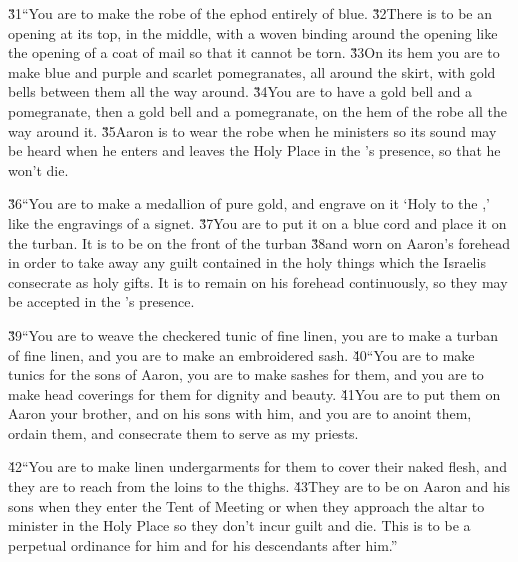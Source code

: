 \v{31}``You are to make the robe of the ephod entirely of blue. \v{32}There is to be an opening at its top, in the middle, with a woven binding around the opening like the opening of a coat of mail so that it cannot be torn. \v{33}On its hem you are to make blue and purple and scarlet pomegranates, all around the skirt, with gold bells between them all the way around. \v{34}You are to have a gold bell and a pomegranate, then a gold bell and a pomegranate, on the hem of the robe all the way around it. \v{35}Aaron is to wear the robe when he ministers so its sound may be heard when he enters and leaves the Holy Place in the 's presence, so that he won't die.

\v{36}``You are to make a medallion of pure gold, and engrave on it `Holy to the ,' like the engravings of a signet. \v{37}You are to put it on a blue cord and place it on the turban. It is to be on the front of the turban \v{38}and worn on Aaron's forehead in order to take away any guilt contained in the holy things which the Israelis consecrate as holy gifts. It is to remain on his forehead continuously, so they may be accepted in the 's presence.

\v{39}``You are to weave the checkered tunic of fine linen, you are to make a turban of fine linen, and you are to make an embroidered sash. \v{40}``You are to make tunics for the sons of Aaron, you are to make sashes for them, and you are to make head coverings for them for dignity and beauty. \v{41}You are to put them on Aaron your brother, and on his sons with him, and you are to anoint them, ordain them, and consecrate them to serve as my priests.

\v{42}``You are to make linen undergarments for them to cover their naked flesh, and they are to reach from the loins to the thighs. \v{43}They are to be on Aaron and his sons when they enter the Tent of Meeting or when they approach the altar to minister in the Holy Place so they don't incur guilt and die. This is to be a perpetual ordinance for him and for his descendants after him.''

